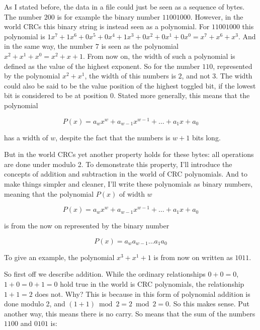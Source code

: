 As I stated before, the data in a file could just be seen as a
sequence of bytes. The number $200$ is for example the binary number
$1100 1000$. However, in the world CRCs this binary string is instead
seen as a polynomial. For $1100 1000$ this polynomial is $1x^7 + 1x^6
+ 0x^5 + 0x^4 + 1x^3 + 0x^2 + 0x^1 + 0x^0 = x^7 + x^6 + x^3$. And in
the same way, the number $7$ is seen as the polynomial $x^2 + x^1 +
x^0 = x^2 + x + 1$. From now on, the width of such a polynomial is
defined as the value of the highest exponent. So for the number $110$,
represented by the polynomial $x^2 + x^1$, the width of this numbers
is $2$, and not $3$. The width could also be said to be the value
position of the highest toggled bit, if the lowest bit is considered
to be at position $0$. Stated more generally, this means that the
polynomial

\begin{equation*}
  P(x) = a_wx^w + a_{w-1}x^{w-1} + \dots + a_{1}x + a_{0}
\end{equation*}

has a width of $w$, despite the fact that the numbers is $w + 1$ bits
long.

But in the world CRCs yet another property holds for these bytes: all
operations are done under modulo 2. To demonstrate this property, I'll
introduce the concepts of addition and subtraction in the world of CRC
polynomials. And to make things simpler and cleaner, I'll write these
polynomials as binary numbers, meaning that the polynomial $P(x)$ of
width $w$

\begin{equation*}
  P(x) = a_wx^w + a_{w-1}x^{w-1} + \dots + a_{1}x + a_{0}
\end{equation*}

is from the now on represented by the binary number

\begin{equation*}
  P(x) = a_wa_{w-1} \dots a_{1} a_{0}
\end{equation*}

To give an example, the polynomial $x^3 + x^1 + 1$ is from now on written as
$1011$.

So first off we describe addition. While the ordinary relationships $0 + 0 =
0$, $1 + 0 = 0 + 1 = 0$ hold true in the world is CRC polynomials, the
relationship $1 + 1 = 2$ does not. Why? This is because in this form
of polynomial addition is done modulo 2, and $(1 + 1) \bmod 2 = 2
\bmod 2 = 0$. So this makes sense. Put another way, this means there
is no carry. So means that the sum of the numbers $1100$ and $0101$
is:


